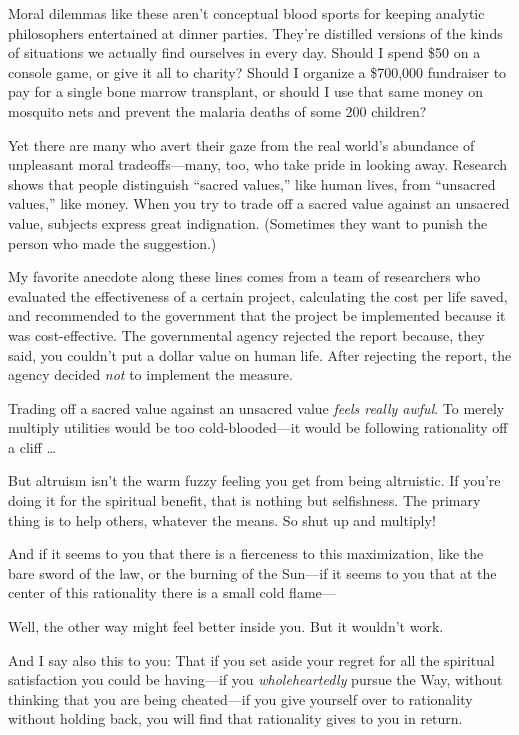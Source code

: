 {
 Moral dilemmas like these aren't conceptual blood
sports for keeping analytic philosophers entertained at dinner parties.
They're distilled versions of the kinds of situations
we actually find ourselves in every day. Should I spend \$50 on a
console game, or give it all to charity? Should I organize a \$700,000
fundraiser to pay for a single bone marrow transplant, or should I use
that same money on mosquito nets and prevent the malaria deaths of some
200 children?}

{
 Yet there are many who avert their gaze from the real
world's abundance of unpleasant moral tradeoffs---many,
too, who take pride in looking away. Research shows that people
distinguish ``sacred values,'' like
human lives, from ``unsacred
values,'' like money. When you try to trade off a
sacred value against an unsacred value, subjects express great
indignation. (Sometimes they want to punish the person who made the
suggestion.)}

{
 My favorite anecdote along these lines comes from a team of
researchers who evaluated the effectiveness of a certain project,
calculating the cost per life saved, and recommended to the government
that the project be implemented because it was cost-effective. The
governmental agency rejected the report because, they said, you
couldn't put a dollar value on human life. After
rejecting the report, the agency decided \textit{not} to implement the
measure.}

{
 Trading off a sacred value against an unsacred value \textit{feels
really awful}. To merely multiply utilities would be too
cold-blooded---it would be following rationality off a cliff \ldots}

{
 But altruism isn't the warm fuzzy feeling you get
from being altruistic. If you're doing it for the
spiritual benefit, that is nothing but selfishness. The primary thing
is to help others, whatever the means. So shut up and multiply!}

{
 And if it seems to you that there is a fierceness to this
maximization, like the bare sword of the law, or the burning of the
Sun---if it seems to you that at the center of this rationality there
is a small cold flame---}

{
 Well, the other way might feel better inside you. But it
wouldn't work.}

{
 And I say also this to you: That if you set aside your regret for
all the spiritual satisfaction you could be having---if you
\textit{wholeheartedly} pursue the Way, without thinking that you are
being cheated---if you give yourself over to rationality without
holding back, you will find that rationality gives to you in return.}

